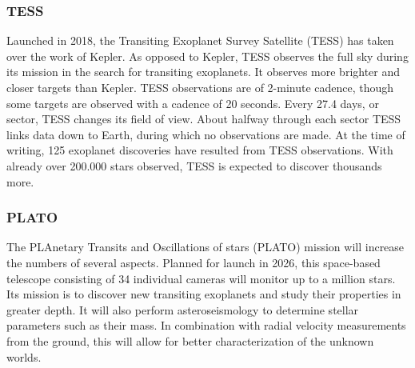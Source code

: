 \subsubsection{TESS}
Launched in 2018, the Transiting Exoplanet Survey Satellite (TESS) has taken over the work of Kepler. As opposed to Kepler, TESS observes the full sky during its mission in the search for transiting exoplanets. It observes more brighter and closer targets than Kepler. TESS observations are of 2-minute cadence, though some targets are observed with a cadence of 20 seconds. Every 27.4 days, or sector, TESS changes its field of view. About halfway through each sector TESS links data down to Earth, during which no observations are made. At the time of writing, 125 exoplanet discoveries have resulted from TESS observations. With already over 200.000 stars observed, TESS is expected to discover thousands more.

\subsubsection{PLATO}
The PLAnetary Transits and Oscillations of stars (PLATO) mission will increase the numbers of several aspects. Planned for launch in 2026, this space-based telescope consisting of 34  individual cameras will monitor up to a million stars. Its mission is to discover new transiting exoplanets and study their properties in greater depth. It will also perform asteroseismology to determine stellar parameters such as their mass. In combination with radial velocity measurements from the ground, this will allow for better characterization of the unknown worlds.